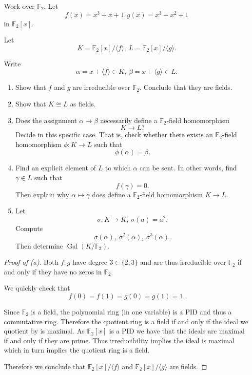 \begin{prob}
    Work over $\mathbb F_2$. Let 
    \[
        f(x) = x^3 + x + 1, 
        g(x) = x^3 + x^2 + 1
    \]
    in $\mathbb F_2[x]$.

    Let 
    \[
        K = \mathbb F_2[x]/\langle f \rangle, \
        L = \mathbb F_2[x]/\langle g \rangle.
    \]

    Write 
    \[
        \alpha = x + \langle f \rangle \in K, 
        \ \beta = x + \langle g \rangle \in L.
    \]

    \begin{enumerate}[label=\alph*)]
        \item Show that $f$ and $g$ are irreducible over 
            $\mathbb F_2$.
            Conclude that they are fields. 
        \item Show that $K \cong L$ as fields. 
        \item Does the assignment $\alpha \mapsto \beta$ 
            necessarily define a $\mathbb F_2$-field homomorphism 
            \[
                K \to L? 
            \]
            Decide in this specific case. That is, check whether 
            there exists an $\mathbb F_2$-field homomorphism 
            $\phi : K \to L$ such that 
            \[
                \phi(\alpha) = \beta. 
            \]
        \item Find an explicit element of $L$ to which 
            $\alpha$ can be sent. In other words, find 
            $\gamma \in L$ such that 
            \[
                f(\gamma) = 0.
            \]
            Then explain why $\alpha \mapsto \gamma$ does 
            define a $\mathbb F_2$-field homomorphism $K \to L$.
        \item Let 
            \[
                \sigma : K \to K, \ \sigma(a) = a^2.
            \]
            Compute 
            \[
                \sigma(\alpha), \ \sigma^2(\alpha), \ 
                \sigma^3(\alpha).
            \]
            Then determine $\operatorname{Gal}(K/\mathbb F_2)$.
    \end{enumerate}
\end{prob}
\begin{proof}[Proof of (a)]
    Both $f,g$ have degree $3 \in \{2,3\}$ and are 
    thus irreducible over $\mathbb F_2$ if and only if they 
    have no zeros in $\mathbb F_2$.

    We quickly check that 
    \[
        f(0) = f(1) = g(0) = g(1) = 1.
    \]

    Since $\mathbb F_2$ is a field, the polynomial ring (in 
    one variable) is a 
    PID and thus a commutative ring. Therefore the 
    quotient ring is a field if and only if 
    the ideal we quotient by is maximal. 
    As $\mathbb F_2[x]$ is a PID we have that 
    the ideals are maximal if and only if they are prime. 
    Thus irreducibility implies the ideal is maximal which 
    in turn implies the quotient ring is a field. 

    Therefore we conclude that $\mathbb F_2[x]/\langle f \rangle$ 
    and $\mathbb F_2[x]/\langle g \rangle$ are fields. 
\end{proof}
